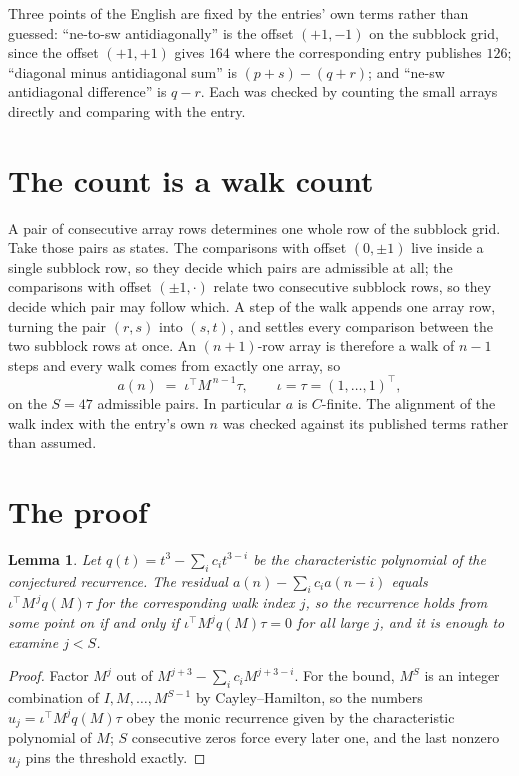\documentclass[11pt,a4paper]{article}
\theoremstyle{plain}
\newtheorem{lemma}[theorem]{Lemma}
\theoremstyle{definition}
\begin{document}
Three points of the English are fixed by the entries' own terms rather than guessed:
``ne-to-sw antidiagonally'' is the offset $(+1,-1)$ on the subblock grid, since the offset
$(+1,+1)$ gives $164$ where the corresponding entry publishes $126$; ``diagonal minus
antidiagonal sum'' is $(p+s)-(q+r)$; and ``ne-sw antidiagonal difference'' is $q-r$. Each was
checked by counting the small arrays directly and comparing with the entry.

\section{The count is a walk count}

A pair of consecutive array rows determines one whole row of the subblock grid. Take those
pairs as states. The comparisons with offset $(0,\pm1)$ live inside a single subblock row, so
they decide which pairs are admissible at all; the comparisons with offset $(\pm1,\cdot)$
relate two consecutive subblock rows, so they decide which pair may follow which. A step of the
walk appends one array row, turning the pair $(r,s)$ into $(s,t)$, and settles every comparison
between the two subblock rows at once. An $(n+1)$-row array is therefore a walk of $n-1$ steps
and every walk comes from exactly one array, so
\[
a(n)\;=\;\iota^{\!\top}M^{\,n-1}\tau,\qquad \iota=\tau=(1,\dots,1)^{\!\top},
\]
on the $S=47$ admissible pairs. In particular $a$ is $C$-finite. The alignment of the walk
index with the entry's own $n$ was checked against its published terms rather than assumed.

\section{The proof}

\begin{lemma}\label{lem:crit}
Let $q(t)=t^{3}-\sum_i c_it^{3-i}$ be the characteristic polynomial of the
conjectured recurrence. The residual $a(n)-\sum_ic_ia(n-i)$ equals
$\iota^{\!\top}M^{\,j}q(M)\tau$ for the corresponding walk index $j$, so the recurrence
holds from some point on if and only if $\iota^{\!\top}M^{j}q(M)\tau=0$ for all large $j$,
and it is enough to examine $j<S$.
\end{lemma}

\begin{proof}
Factor $M^{j}$ out of $M^{j+3}-\sum_ic_iM^{j+3-i}$. For the bound, $M^{S}$
is an integer combination of $I,M,\dots,M^{S-1}$ by Cayley--Hamilton, so the numbers
$u_j=\iota^{\!\top}M^{j}q(M)\tau$ obey the monic recurrence given by the characteristic
polynomial of $M$; $S$ consecutive zeros force every later one, and the last nonzero $u_j$
pins the threshold exactly.
\end{proof}
\end{document}
